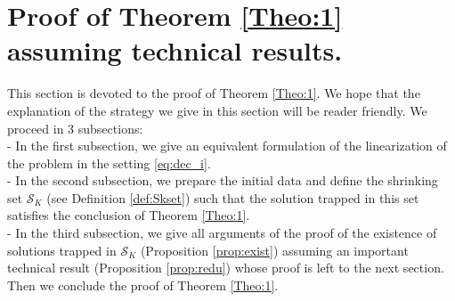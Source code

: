 \documentclass[11pt]{aims}
\theoremstyle{definition}
\numberwithin{equation}{section}
\begin{document}
\section{Proof of Theorem \ref{Theo:1} assuming technical results.} \label{sec:3}
This section is devoted to the proof of Theorem \ref{Theo:1}. We hope that the explanation of the strategy we give in this section will be reader friendly. We proceed in 3 subsections:\\
- In the first subsection, we give an equivalent formulation of the linearization of the problem in the setting \eqref{eq:dec_i}.\\
- In the second subsection, we prepare the initial data and define the shrinking set ${\mathcal{S}}_K$ (see Definition \ref{def:Skset}) such that the solution trapped in this set satisfies the conclusion of Theorem \ref{Theo:1}.\\
- In the third subsection, we give all arguments of the proof of the existence of solutions trapped in ${\mathcal{S}}_K$ (Proposition \ref{prop:exist}) assuming an important technical result (Proposition \ref{prop:redu}) whose proof is left to the next section. Then we conclude the proof of Theorem \ref{Theo:1}. 
\end{document}
